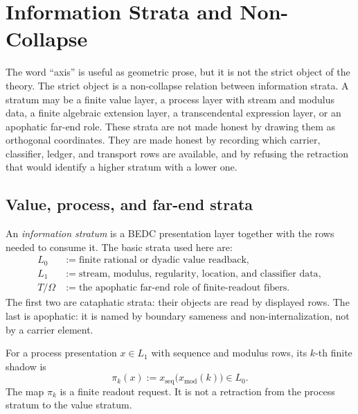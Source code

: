 \chapter{Information Strata and Non-Collapse}
\label{ch:visions-apophatic-information-strata-noncollapse}

The word ``axis'' is useful as geometric prose, but it is not the strict
object of the theory.  The strict object is a non-collapse relation between
information strata.  A stratum may be a finite value layer, a process layer
with stream and modulus data, a finite algebraic extension layer, a
transcendental expression layer, or an apophatic far-end role.  These strata
are not made honest by drawing them as orthogonal coordinates.  They are made
honest by recording which carrier, classifier, ledger, and transport rows are
available, and by refusing the retraction that would identify a higher
stratum with a lower one.

\section{Value, process, and far-end strata}
\label{sec:information-strata-value-process-far-end}

\begin{definition}
\label{def:information-stratum}
An \emph{information stratum} is a BEDC presentation layer together with the
rows needed to consume it.  The basic strata used here are:
$$
\begin{aligned}
L_0
&:=\text{finite rational or dyadic value readback},\\
L_1
&:=\text{stream, modulus, regularity, location, and classifier data},\\
T/\Omega
&:=\text{the apophatic far-end role of finite-readout fibers}.
\end{aligned}
$$
The first two are cataphatic strata: their objects are read by displayed
rows.  The last is apophatic: it is named by boundary sameness and
non-internalization, not by a carrier element.
\end{definition}

\begin{definition}
\label{def:information-stratum-finite-shadow}
For a process presentation $x\in L_1$ with sequence and modulus rows, its
$k$-th finite shadow is
$$
\pi_k(x):=
x_{\mathrm{seq}}\bigl(x_{\mathrm{mod}}(k)\bigr)\in L_0.
$$
The map $\pi_k$ is a finite readout request.  It is not a retraction from the
process stratum to the value stratum.
\end{definition}

